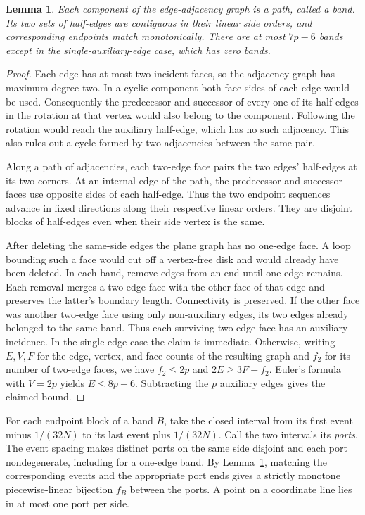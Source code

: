 \documentclass[10pt,letterpaper]{article}
\newtheorem{lemma}{Lemma}
\begin{document}
\begin{lemma}\label{lem:bands}
Each component of the edge-adjacency graph is a path, called a \emph{band}. Its two sets of half-edges are contiguous in their linear side orders, and corresponding endpoints match monotonically. There are at most \(7p-6\) bands except in the single-auxiliary-edge case, which has zero bands.
\end{lemma}
\begin{proof}
Each edge has at most two incident faces, so the adjacency graph has maximum degree two. In a cyclic component both face sides of each edge would be used. Consequently the predecessor and successor of every one of its half-edges in the rotation at that vertex would also belong to the component. Following the rotation would reach the auxiliary half-edge, which has no such adjacency. This also rules out a cycle formed by two adjacencies between the same pair.

Along a path of adjacencies, each two-edge face pairs the two edges' half-edges at its two corners. At an internal edge of the path, the predecessor and successor faces use opposite sides of each half-edge. Thus the two endpoint sequences advance in fixed directions along their respective linear orders. They are disjoint blocks of half-edges even when their side vertex is the same.

After deleting the same-side edges the plane graph has no one-edge face. A loop bounding such a face would cut off a vertex-free disk and would already have been deleted. In each band, remove edges from an end until one edge remains. Each removal merges a two-edge face with the other face of that edge and preserves the latter's boundary length. Connectivity is preserved. If the other face was another two-edge face using only non-auxiliary edges, its two edges already belonged to the same band. Thus each surviving two-edge face has an auxiliary incidence. In the single-edge case the claim is immediate. Otherwise, writing \(E,V,F\) for the edge, vertex, and face counts of the resulting graph and \(f_2\) for its number of two-edge faces, we have \(f_2\le 2p\) and \(2E\ge 3F-f_2\). Euler's formula with \(V=2p\) yields \(E\le 8p-6\). Subtracting the \(p\) auxiliary edges gives the claimed bound.
\end{proof}

For each endpoint block of a band \(B\), take the closed interval from its first event minus \(1/(32N)\) to its last event plus \(1/(32N)\). Call the two intervals its \emph{ports}. The event spacing makes distinct ports on the same side disjoint and each port nondegenerate, including for a one-edge band. By Lemma~\ref{lem:bands}, matching the corresponding events and the appropriate port ends gives a strictly monotone piecewise-linear bijection \(f_B\) between the ports. A point on a coordinate line lies in at most one port per side.
\end{document}
